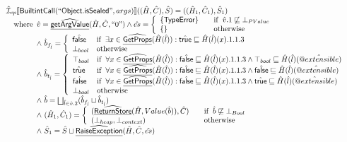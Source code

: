 \documentclass{article}
\makeatletter
\newcommand{\SF}[1]{\mbox{\textsf{#1}}}
\newcommand{\wherec}[1]{{\rm where}\begin{array}[t]{l}#1\end{array}}
\newcommand{\ifc}[1]{{\rm if}\begin{array}[t]{l}#1\end{array}}
\newcommand{\owc}{{\rm otherwise}}
\newcommand{\aI}{\hat{\mathcal{I}}}
\newcommand{\lbr}{\llbracket}
\newcommand{\rbr}{\rrbracket}
\newcommand{\ahf}[1]{\widehat{\underline{\sf #1}}}
\newcommand{\avarprop}[1]{\hat{@#1}}
\newcommand{\atrue}{\hat{\SF{true}}}
\newcommand{\afalse}{\hat{\SF{false}}}
\makeatother
\begin{document}
\[
\begin{array}{l}


\aI _{cp}\lbr \SF{BuiltintCall}(``\SF{Object.isSealed}",args)\rbr((\hat{H},\hat{C}), \hat{S})
  = ((\hat{H}_1, \hat{C}_1), \hat{S}_1)\\
\quad\wherec{
 \hat{v} = \ahf{getArgValue}(\hat{H}, \hat{C}, ``0")
  \land \hat{es} =
    \left\{
    \begin{array}{l@{\quad\quad}l}
      \{ \SF{TypeError} \} & \ifc{\hat{v}.1 \not\sqsubseteq \bot_{PValue}}\\
      \{ \}& \owc\\
    \end{array}
    \right.\\
  \land\ \hat{b}_{f_{\hat{l}}} =\left\{\begin{array}{ll}
    \afalse
    & \ifc{ \exists x \in \ahf{GetProps}(\hat{H}(\hat{l})): \atrue \sqsubseteq \hat{H}(\hat{l})(x).1.1.3}\\
    \bot_{bool} & \owc
    \end{array}\right.\\
  \land\ \hat{b}_{t_{\hat{l}}} =\left\{\begin{array}{ll}
    \top_{bool}
    & \ifc{\forall x \in \ahf{GetProps}(\hat{H}(\hat{l})):
      \afalse \sqsubseteq \hat{H}(\hat{l})(x).1.1.3 \land \top_{bool} \sqsubseteq \hat{H}(\hat{l})(\avarprop{extensible})}\\
    \atrue
    & \ifc{\forall x \in \ahf{GetProps}(\hat{H}(\hat{l})):
      \afalse \sqsubseteq \hat{H}(\hat{l})(x).1.1.3 \land \afalse \sqsubseteq \hat{H}(\hat{l})(\avarprop{extensible})}\\
    \afalse
    & \ifc{\forall x \in \ahf{GetProps}(\hat{H}(\hat{l})):
    \afalse \sqsubseteq \hat{H}(\hat{l})(x).1.1.3 \land \atrue \sqsubseteq \hat{H}(\hat{l})(\avarprop{extensible})}\\
    \bot_{bool} & \owc
    \end{array}\right.\\
  \land\ \hat{b} =  \bigsqcup_{\hat{l} \in \hat{v}.2}(\hat{b}_{f_{\hat{l}}} \sqcup \hat{b}_{t_{\hat{l}}})\\
  \land\ (\hat{H}_1, \hat{C}_1) = 
    \left\{\begin{array}{l@{\quad\quad}l}
      (\ahf{ReturnStore}(\hat{H}, Value(\hat{b})), \hat{C})
      & \ifc{\hat{b} \not\sqsubseteq \bot_{Bool}}\\
      (\bot_{heap}, \bot_{context}) & \owc \\
    \end{array}\right.\\
  \land\ \hat{S}_1 = \hat{S} \sqcup \ahf{RaiseException}(\hat{H}, \hat{C}, \hat{es})\\
  }\\
\\\\ 


\end{array}\]
\end{document}
